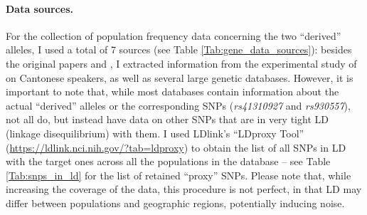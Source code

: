 \documentclass[twoside,twocolumn]{article}
\begin{document}
\paragraph{Data sources.}
For the collection of population frequency data concerning the two ``derived'' alleles, I used a total of 7 sources (see Table \ref{Tab:gene_data_sources}): besides the original papers \citet{evans_microcephalin_2005} and \citet{mekelbobrov_aspm_2005}, I extracted information from the experimental study of \citet{wong_sciadv_2020} on Cantonese speakers, as well as several large genetic databases.
However, it is important to note that, while most databases contain information about the actual ``derived'' alleles or the corresponding SNPs (\textit{rs41310927} and \textit{rs930557}), not all do, but instead have data on other SNPs that are in very tight LD (linkage disequilibrium) with them.
I used LDlink’s ``LDproxy Tool'' (\url{https://ldlink.nci.nih.gov/?tab=ldproxy}) to obtain the list of all SNPs in LD with the target ones across all the populations in the database -- see Table \ref{Tab:snps_in_ld} for the list of retained ``proxy'' SNPs.
Please note that, while increasing the coverage of the data, this procedure is not perfect, in that LD may differ between populations and geographic regions, potentially inducing noise.
\end{document}
